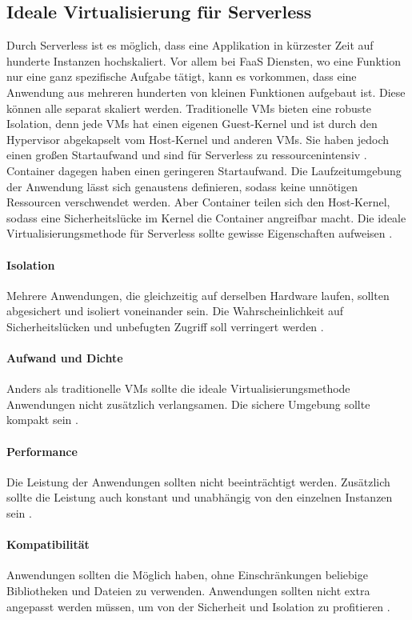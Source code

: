 \subsection{Ideale Virtualisierung für Serverless}
Durch Serverless ist es möglich,
dass eine Applikation in kürzester Zeit
auf hunderte Instanzen hochskaliert. Vor allem bei FaaS Diensten,
wo eine Funktion nur eine ganz spezifische Aufgabe tätigt,
kann es vorkommen, dass eine Anwendung aus mehreren hunderten
von kleinen Funktionen aufgebaut ist. Diese können alle separat
skaliert werden. Traditionelle VMs bieten
eine robuste Isolation, denn jede VMs hat einen eigenen
Guest-Kernel und ist durch den Hypervisor
abgekapselt vom Host-Kernel und anderen VMs. Sie haben jedoch
einen großen Startaufwand und sind für Serverless zu
ressourcenintensiv \cite{Firecracker}. Container dagegen
haben einen geringeren Startaufwand. Die Laufzeitumgebung der
Anwendung lässt sich genaustens definieren, sodass keine
unnötigen Ressourcen verschwendet werden. Aber Container
teilen sich den Host-Kernel, sodass eine Sicherheitslücke
im Kernel die Container angreifbar macht.
Die ideale Virtualisierungsmethode für Serverless sollte
gewisse Eigenschaften aufweisen \cite{Firecracker}.

\paragraph{Isolation} Mehrere Anwendungen, die gleichzeitig
auf derselben Hardware laufen, sollten abgesichert und
isoliert voneinander sein. Die Wahrscheinlichkeit auf
Sicherheitslücken und unbefugten Zugriff soll verringert werden
\cite{Firecracker}.

\paragraph{Aufwand und Dichte} Anders als traditionelle VMs
sollte die ideale Virtualisierungsmethode Anwendungen
nicht zusätzlich verlangsamen. Die sichere Umgebung sollte
kompakt sein \cite{Firecracker}.

\paragraph{Performance} Die Leistung der Anwendungen sollten
nicht beeinträchtigt werden. Zusätzlich sollte die Leistung auch 
konstant und unabhängig von den einzelnen Instanzen sein
\cite{Firecracker}.

\paragraph{Kompatibilität} Anwendungen sollten die Möglich haben,
ohne Einschränkungen beliebige Bibliotheken und Dateien zu
verwenden. Anwendungen sollten nicht extra angepasst werden
müssen, um von der Sicherheit und Isolation zu profitieren
\cite{Firecracker}.

